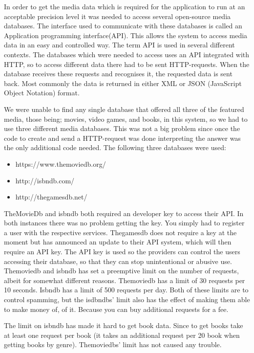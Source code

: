 In order to get the media data which is required for the application to run at an acceptable precision level it was needed to access several open-source media databases. The interface used to communicate with these databases is called an Application programming interface(API). This allows the system to access media data in an easy and controlled way. The term API is used in several different contexts\cite{apiWiki}. The databases which were  needed to access uses an API integrated with HTTP, so to access different data there had to be sent HTTP-requests. When the database receives these requests and recognises it, the requested data is sent back. Most commonly the data is returned in either XML or JSON (JavaScript Object Notation) format.

We were unable to find any single database that offered all three of the featured media, those being; movies, video games, and books, in this system, so we had to use three different media databases. This was not a big problem since once the code to create and send a HTTP-request was done interpreting the answer was the only additional code needed.  The following three databases were used:

\begin{itemize}
	\item https://www.themoviedb.org/
	\item http://isbndb.com/
	\item http://thegamesdb.net/
\end{itemize}

TheMovieDb and isbndb both required an developer key to access their API. In both instances there was no problem getting the key. You simply had to register a user with the respective services. %
Thegamesdb does not require a key at the moment but has announced an update to their API system, which will then require an API key.
The API key is used so the providers can control the users accessing their database, so that  they can stop unintentional or abusive use. Themoviedb and isbndb has set a preemptive limit on the number of requests, albeit for somewhat different reasons. Themoviedb has a limit of 30 requests per 10 seconds\cite{themoviedbApi}. Isbndb has a limit of 500 requests per day. Both of these limits are to control spamming, but the isdbndbs’ limit also has the effect of making them able to make money of, of it. Because you can buy additional requests for a fee.

The limit on isbndb has made it hard to get book data. Since to get books take at least one request per book (it takes an additional request per 20 book when getting books by genre). Themoviedbs’ limit has not caused any trouble.

